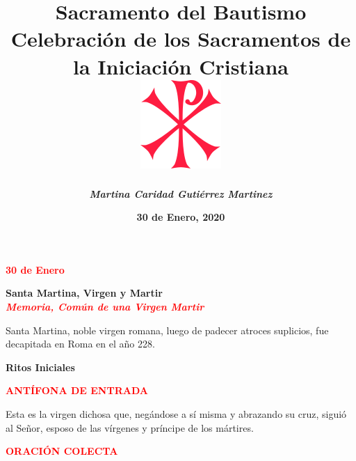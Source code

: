 \documentclass[12pt, letterpaper]{report}
\begin{document}
\title{
    \Huge \bfseries Sacramento del Bautismo \\
    \large Celebraci\'on de los Sacramentos de la Iniciaci\'on Cristiana \\
    \vspace{2em}
    \includegraphics{cruz_cristo}
}
\author{
    \Large \em \bfseries Martina Caridad Guti\'errez Martinez \\
}
\date{\bfseries 30 de Enero, 2020}

\maketitle

\begin{center}
\Large {\bfseries \textcolor{red}{30 de Enero}}
\end{center}

\begin{center}
\Huge {\bfseries Santa Martina, Virgen y Martir} \\
\Large {\bfseries \em \textcolor{red}{Memoria, Com\'un de una Virgen Martir}}
\end{center}

\Large {Santa Martina, noble virgen romana, luego de padecer atroces suplicios, fue decapitada en Roma en el a\~no 228.}

\begin{center}
\Huge {\bfseries Ritos Iniciales}
\end{center}

\Large {\bfseries \textcolor{red}{ANT\'IFONA DE ENTRADA} } \newline

\Large {Esta es la virgen dichosa que, neg\'andose a s\'i misma y abrazando su cruz, sigui\'o al Se\~nor, esposo de las v\'irgenes y pr\'incipe de los m\'artires.} \newline


\Large {\bfseries \textcolor{red}{ORACI\'ON COLECTA}}
\end{document}
